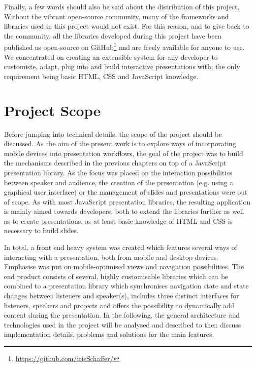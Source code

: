 Finally, a few words should also be said about the distribution of this project. Without the vibrant open-source community, many of the frameworks and libraries used in this project would not exist. For this reason, and to give back to the community, all the libraries developed during this project have been published as open-source on GitHub\footnote{\href{https://github.com/irisSchaffer?tab=repositories}{\textsf{https://github.com/irisSchaffer/}}} and are freely available for anyone to use. We concentrated on creating an extensible system for any developer to customiste, adapt, plug into and build interactive presentations with; the only requirement being basic HTML, CSS and JavaScript knowledge.

\section{Project Scope}
\label{sec:implementation-scope}
Before jumping into technical details, the scope of the project should be discussed. As the aim of the present work is to explore ways of incorporating mobile devices into presentation workflows, the goal of the project was to build the mechanisms described in the previous chapters on top of a JavaScript presentation library. As the focus was placed on the interaction possibilities between speaker and audience, the creation of the presentation (e.g. using a graphical user interface) or the management of slides and presentations were out of scope. As with most JavaScript presentation libraries, the resulting application is mainly aimed towards developers, both to extend the libraries further as well as to create presentations, as at least basic knowledge of HTML and CSS is necessary to build slides.

In total, a front end heavy system was created which features several ways of interacting with a presentation, both from mobile and desktop devices. Emphasise was put on mobile-optimised views and navigation possibilities. The end product consists of several, highly customisable libraries which can be combined to a presentation library which synchronises navigation state and state changes between listeners and speaker(s), includes three distinct interfaces for listeners, speakers and projects and offers the possibility to dynamically add content during the presentation. In the following, the general architecture and technologies used in the project will be analysed and described to then discuss implementation details, problems and solutions for the main features.

